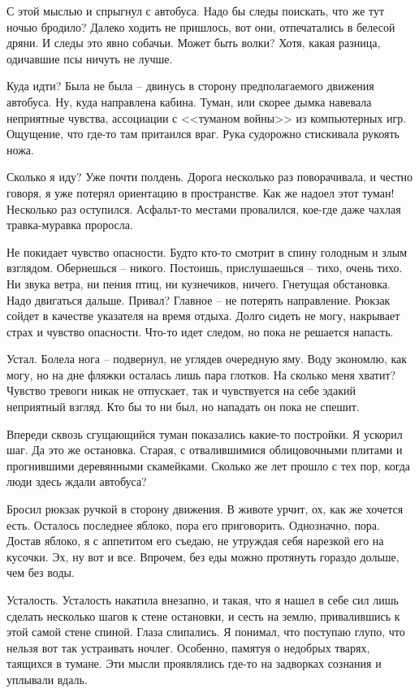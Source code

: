 \documentclass[a4paper]{book}
\begin{document}
С этой мыслью и спрыгнул с автобуса. Надо бы следы поискать, что же тут ночью бродило? Далеко ходить не пришлось, вот они, отпечатались в белесой дряни. И следы это явно собачьи. Может быть волки? Хотя, какая разница, одичавшие псы ничуть не лучше. 

Куда идти? Была не была -- двинусь в сторону предполагаемого движения автобуса. Ну, куда направлена кабина. Туман, или скорее дымка навевала неприятные чувства, ассоциации с <<туманом войны>> из компьютерных игр. Ощущение, что где-то там притаился враг. Рука судорожно стискивала рукоять ножа.

Сколько я иду? Уже почти полдень. Дорога несколько раз поворачивала, и честно говоря, я уже потерял ориентацию в пространстве. Как же надоел этот туман! Несколько раз оступился. Асфальт-то местами провалился, кое-где даже чахлая травка-муравка проросла.

Не покидает чувство опасности. Будто кто-то смотрит в спину голодным и злым взглядом. Обернешься -- никого. Постоишь, прислушаешься -- тихо, очень тихо. Ни звука ветра, ни пения птиц, ни кузнечиков, ничего. Гнетущая обстановка. Надо двигаться дальше. Привал? Главное -- не потерять направление. Рюкзак сойдет в качестве указателя на время отдыха. Долго сидеть не могу, накрывает страх и чувство опасности. Что-то идет следом, но пока не решается напасть. 

Устал. Болела нога -- подвернул, не углядев очередную яму. Воду экономлю, как могу, но на дне фляжки осталась лишь пара глотков. На сколько меня хватит? Чувство тревоги никак не отпускает, так и чувствуется на себе эдакий неприятный взгляд. Кто бы то ни был, но нападать он пока не спешит.

Впереди сквозь сгущающийся туман показались какие-то постройки. Я ускорил шаг. Да это же остановка. Старая, с отвалившимися облицовочными плитами и прогнившими деревянными скамейками. Сколько же лет прошло с тех пор, когда люди здесь ждали автобуса?

Бросил рюкзак ручкой в сторону движения. В животе урчит, ох, как же хочется есть. Осталось последнее яблоко, пора его приговорить. Однозначно, пора. Достав яблоко, я с аппетитом его съедаю, не утруждая себя нарезкой его на кусочки. Эх, ну вот и все. Впрочем, без еды можно протянуть гораздо дольше, чем без воды. 

Усталость. Усталость накатила внезапно, и такая, что я нашел в себе сил лишь сделать несколько шагов к стене остановки, и сесть на землю, привалившись к этой самой стене спиной. Глаза слипались. Я понимал, что поступаю глупо, что нельзя вот так устраивать ночлег. Особенно, памятуя о недобрых тварях, таящихся в тумане. Эти мысли проявлялись где-то на задворках сознания и уплывали вдаль. 
\\
\end{document}
